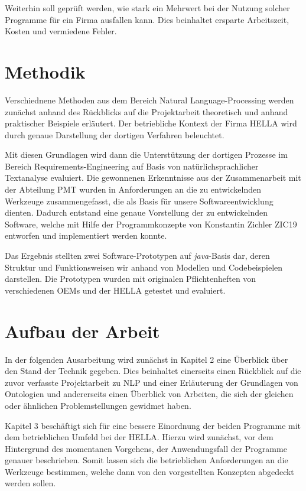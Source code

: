 \documentclass[12pt]{report}
\begin{document}
Weiterhin soll geprüft werden, wie stark ein Mehrwert bei der Nutzung solcher Programme für ein Firma ausfallen kann. Dies beinhaltet ersparte Arbeitszeit, Kosten und vermiedene Fehler. 

\section{Methodik}
Verschiednene Methoden aus dem Bereich Natural Language-Processing werden zunächst anhand des Rückblicks auf die Projektarbeit theoretisch und anhand praktischer Beispiele erläutert. Der betriebliche Kontext der Firma HELLA wird durch genaue Darstellung der dortigen Verfahren beleuchtet. 

Mit diesen Grundlagen wird dann die Unterstützung der dortigen Prozesse im Bereich Requirements-Engineering auf Basis von natürlichsprachlicher Textanalyse evaluiert. Die gewonnenen Erkenntnisse aus der Zusammenarbeit mit der Abteilung PMT wurden in Anforderungen an die zu entwickelnden Werkzeuge zusammengefasst, die als Basis für unsere Softwareentwicklung dienten. Dadurch entstand eine genaue Vorstellung der zu entwickelnden Software, welche mit Hilfe der Programmkonzepte von Konstantin Zichler ZIC19 entworfen und implementiert werden konnte. 

Das Ergebnis stellten zwei Software-Prototypen auf \textit{java}-Basis dar, deren Struktur und Funktionsweisen wir anhand von Modellen und Codebeispielen darstellen. Die Prototypen wurden mit originalen Pflichtenheften von verschiedenen OEMs und der HELLA getestet und evaluiert.

\section{Aufbau der Arbeit}
In der folgenden Ausarbeitung wird zunächst in Kapitel 2 eine Überblick über den Stand der Technik gegeben. Dies beinhaltet einerseits einen Rückblick auf die zuvor verfasste Projektarbeit zu NLP und einer Erläuterung der Grundlagen von Ontologien und andererseits einen Überblick von Arbeiten, die sich der gleichen oder ähnlichen Problemstellungen gewidmet haben. 

Kapitel 3 beschäftigt sich für eine bessere Einordnung der beiden Programme mit dem betrieblichen Umfeld bei der HELLA. Hierzu wird zunächst, vor dem Hintergrund des momentanen Vorgehens, der Anwendungsfall der Programme genauer beschrieben. Somit lassen sich die betrieblichen Anforderungen an die Werkzeuge bestimmen, welche dann von den vorgestellten Konzepten abgedeckt werden sollen. 
\end{document}
